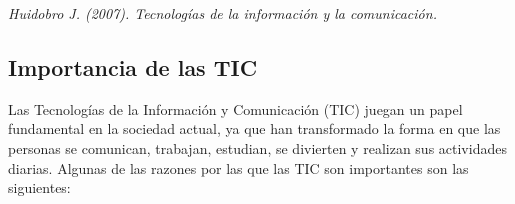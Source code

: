 \documentclass{article}
\begin{document}
    \begin{flushright}
      \textit{Huidobro J. (2007). Tecnologías de la información y la comunicación.}
    \end{flushright}



  \subsection{Importancia de las TIC}

    Las Tecnologías de la Información y Comunicación (TIC) juegan un papel fundamental en la sociedad actual, ya que han transformado la forma en que las personas se comunican, trabajan, estudian, se divierten y realizan sus actividades diarias. Algunas de las razones por las que las TIC son importantes son las siguientes:
\end{document}
